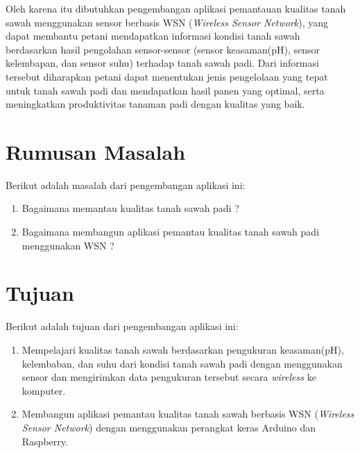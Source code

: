 Oleh karena itu dibutuhkan pengembangan aplikasi pemantauan kualitas tanah sawah menggunakan sensor berbasis WSN (\textit{Wireless Sensor Network}), yang dapat membantu petani mendapatkan informasi kondisi tanah sawah berdasarkan hasil pengolahan sensor-sensor (sensor keasaman(pH), sensor kelembapan, dan sensor suhu) terhadap tanah sawah padi. Dari informasi tersebut diharapkan petani dapat menentukan jenis pengelolaan yang tepat untuk tanah sawah padi dan mendapatkan hasil panen yang optimal, serta meningkatkan produktivitas tanaman padi dengan kualitas yang baik.












\section{Rumusan Masalah}
\label{sec:rumusan}
Berikut adalah masalah dari pengembangan aplikasi ini:
    \begin{enumerate}
         \item Bagaimana memantau kualitas tanah sawah padi ?
         \item Bagaimana membangun aplikasi pemantau kualitas tanah sawah padi menggunakan WSN ?
    \end{enumerate}


\section{Tujuan}
\label{sec:tujuan}
Berikut adalah tujuan dari pengembangan aplikasi ini:
    \begin{enumerate}
         \item Mempelajari kualitas tanah sawah berdasarkan pengukuran keasaman(pH), kelembaban, dan suhu dari kondisi tanah sawah padi dengan menggunakan sensor dan mengirimkan data pengukuran tersebut secara \textit{wireless} ke komputer.
         
         \item Membangun aplikasi pemantau kualitas tanah sawah berbasis WSN (\textit{Wireless Sensor Network}) dengan menggunakan perangkat keras Arduino dan Raspberry.
    \end{enumerate}


